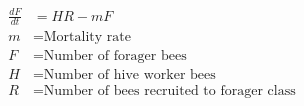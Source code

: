 \documentclass[varwidth=true, border=2pt]{standalone}
\begin{document}
\begin{align*}
\frac{dF}{dt} & = HR - mF\nonumber \\
m & =  \text{Mortality rate} \nonumber \\
F & =  \text{Number of forager bees} \nonumber \\
H & =  \text{Number of hive worker bees} \nonumber \\
R & =  \text{Number of bees recruited to forager class} \nonumber \\
\end{align*} 
\end{document}
